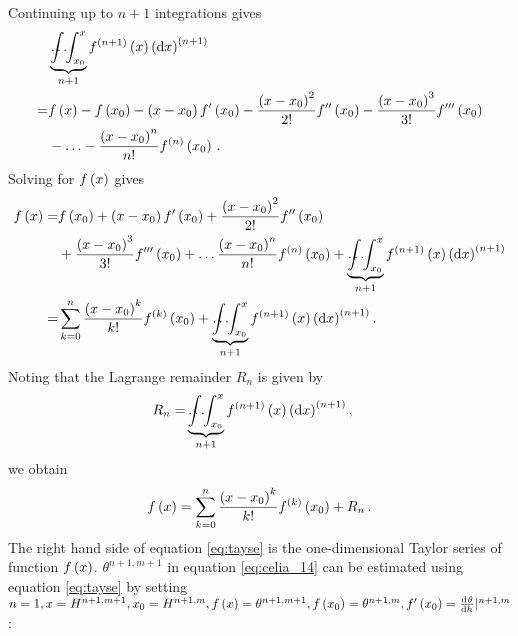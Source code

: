 Continuing up to $n + 1$ integrations gives
\begin{align*}
  &\underbrace{\int \hspace{-4mm} \hdots \hspace{-1mm} \int_{x_0}^x}_{n+1}{f^{\del{ n+1 }}\del{ x }\del{ \dif x }^{\del{ n+1 }}} \\
  = &f\del{ x } - f\del{ x_0 } - \del{ x - x_0 } f'\del{ x_0 } - \frac{\del{ x - x_0 }^2}{2!} f''\del{ x_0 } - \frac{\del{ x - x_0 }^3}{3!} f'''\del{ x_0 } \\
  &- \mathellipsis - \frac{\del{ x - x_0 }^n}{n!} f^{\del{ n }}\del{ x_0 } \, .
\end{align*}
Solving for $f\del{ x }$ gives
\begin{align*}
  f\del{ x } = &f\del{ x_0 }
           + \del{ x - x_0 } f'\del{ x_0 }
           + \frac{\del{ x-x_0 }^2}{2!} f''\del{ x_0 } \\
         &+ \frac{\del{ x - x_0 }^3}{3!} f'''\del{ x_0 }
           + \mathellipsis \frac{\del{ x - x_0 }^n}{n!} f^{\del{ n }}\del{ x_0 }
           + \underbrace{\int \hspace{-4mm} \hdots \hspace{-1mm} \int_{x_0}^x}_{n+1}{f^{\del{ n+1 }}\del{ x }\del{ \dif x }^{\del{ n+1 }}} \\
  = &\sum_{k=0}^n{\frac{\del{ x - x_0 }^k}{k!}}f^{\del{ k }}\del{ x_0 } + \underbrace{\int \hspace{-4mm} \hdots \hspace{-1mm} \int_{x_0}^x}_{n+1}{f^{\del{ n+1 }}\del{ x }\del{ \dif x }^{\del{ n+1 }}} \, .
\end{align*}
Noting that the Lagrange remainder $R_n$ is given by
\begin{align*}
  R_n = &\underbrace{\int \hspace{-4mm} \hdots \hspace{-1mm} \int_{x_0}^x}_{n+1}{f^{\del{ n+1 }}\del{ x }\del{ \dif x }^{\del{ n+1 }}} \, ,
\end{align*}
we obtain
\begin{equation}
  \label{eq:tayse}
  f\del{ x } = \sum_{k=0}^n{\frac{\del{ x - x_0 }^k}{k!}}f^{\del{ k }}\del{ x_0 } + R_n \, .
\end{equation}
The right hand side of equation \eqref{eq:tayse} is the one-dimensional Taylor series of function $f\del{ x }$.  $\theta^{n+1,m+1}$ in equation \eqref{eq:celia_14} can be estimated using equation \eqref{eq:tayse} by setting $n = 1, x = H^{n+1,m+1}, x_0 = H^{n+1,m}, f\del{ x } = \theta^{n+1,m+1}, f\del{ x_0 } = \theta^{n+1,m}, f'\del{ x_0 } = \evalat{\od{\theta}{h}}{n+1,m}$ \parencite{celia_general_1990}:
